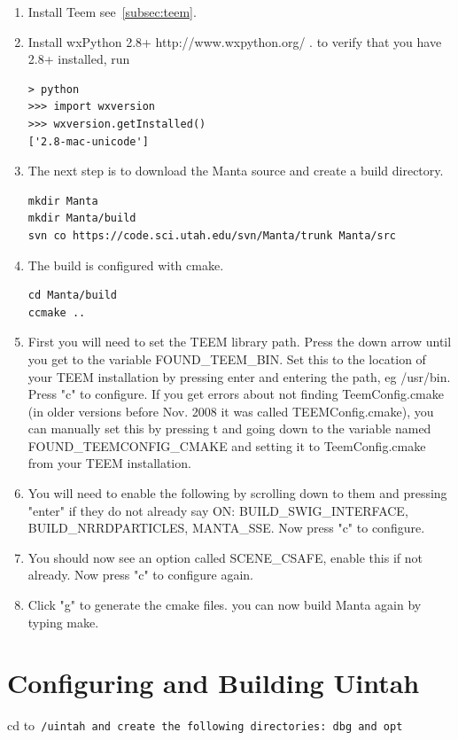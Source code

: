 \documentclass[12pt]{article}
\begin{document}
\begin{enumerate}
\item
Install Teem see~\ref{subsec:teem}.
\item
Install wxPython 2.8+ http://www.wxpython.org/ .  
to verify that you have 2.8+ installed, run
\begin{verbatim}
> python
>>> import wxversion
>>> wxversion.getInstalled()
['2.8-mac-unicode']
\end{verbatim}
\item
The next step is to download the Manta source and create a build directory.
\begin{verbatim}
mkdir Manta
mkdir Manta/build
svn co https://code.sci.utah.edu/svn/Manta/trunk Manta/src
\end{verbatim}
\item
The build is configured with cmake.
\begin{verbatim}
cd Manta/build
ccmake ..
\end{verbatim}
\item First you will need to set the TEEM library path. Press the down
  arrow until you get to the variable FOUND\_TEEM\_BIN. Set this to
  the location of your TEEM installation by pressing enter and
  entering the path, eg /usr/bin. Press "c" to configure. If you get
  errors about not finding TeemConfig.cmake (in older versions before
  Nov. 2008 it was called TEEMConfig.cmake), you can manually set this
  by pressing t and going down to the variable named
  FOUND\_TEEMCONFIG\_CMAKE and setting it to TeemConfig.cmake from
  your TEEM installation.
\item You will need to enable the following by scrolling down to them
  and pressing "enter" if they do not already say ON:
  BUILD\_SWIG\_INTERFACE, BUILD\_NRRDPARTICLES, MANTA\_SSE. Now press
  "c" to configure.
 \item
 You should now see an option called SCENE\_CSAFE, enable this if not already. Now press "c" to configure again. 
 \item
 Click "g" to generate the cmake files. you can now build Manta again by typing make. 
\end{enumerate}

\section{Configuring and Building Uintah}

cd to\tt ~/uintah \normalfont and create the following directories:
dbg and opt
\end{document}
